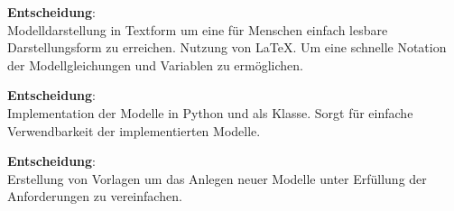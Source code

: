 \textbf{Entscheidung}:\\
Modelldarstellung in Textform um eine für Menschen einfach lesbare Darstellungsform zu erreichen. Nutzung von \LaTeX. Um eine schnelle Notation der Modellgleichungen und Variablen zu ermöglichen.

\textbf{Entscheidung}:\\
Implementation der Modelle in Python und als Klasse. Sorgt für einfache Verwendbarkeit der implementierten Modelle. 

\textbf{Entscheidung}:\\
Erstellung von Vorlagen um das Anlegen neuer Modelle unter Erfüllung der Anforderungen zu vereinfachen.




